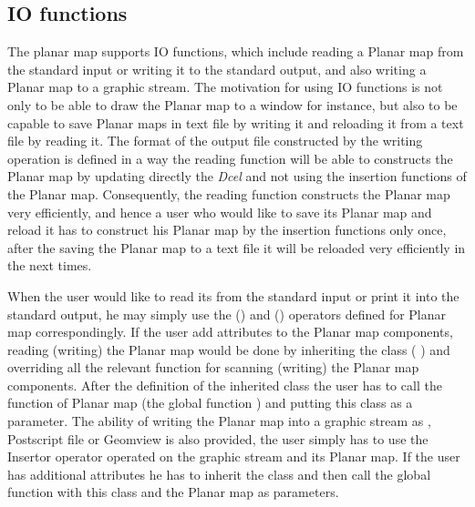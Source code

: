 \begin{ccAdvanced}

\end{ccAdvanced}
\begin{ccAdvanced}
\subsection*{IO functions}
The planar map supports IO functions, which include reading a Planar map from the standard input or writing it to the standard output, 
and also writing a Planar map to a graphic stream.
The motivation for using IO functions is not only to be able to draw the Planar map to a window for instance, but also to be capable to save Planar maps 
in text file by writing it and reloading it from a text file by reading it. The format of the output file constructed by the writing operation is 
defined in a way the reading function will be able to constructs the Planar map by updating 
directly the {\em Dcel} and not using the insertion functions of the Planar map. Consequently, the reading function constructs the Planar map very 
efficiently, and hence a user who would like to save its Planar map and reload it has to construct his Planar map by the insertion functions only once, 
after the saving the Planar map to a text file it will be reloaded very efficiently in the next times.

When the user would like to read its  from the standard input or print it into 
the standard output, he may simply use the  (\ccc{ >> }) and  (\ccc{ << }) operators defined for Planar map correspondingly. 
If the user add attributes to the Planar map components, reading (writing) the Planar map would be done by inheriting the class  
(  ) and overriding all the relevant function for scanning (writing) the Planar map components. 
After the definition of the inherited class the user has to call the function  of Planar map (the global function  ) 
and putting this class as a parameter.
The ability of writing the Planar map into a graphic stream as , Postscript file or Geomview is also provided, 
the user simply has to use the Insertor operator operated on the graphic stream and its Planar map. 
If the user has additional attributes he has to inherit the class  and then call the global function  
with this class and the Planar map as parameters.


\end{ccAdvanced}
